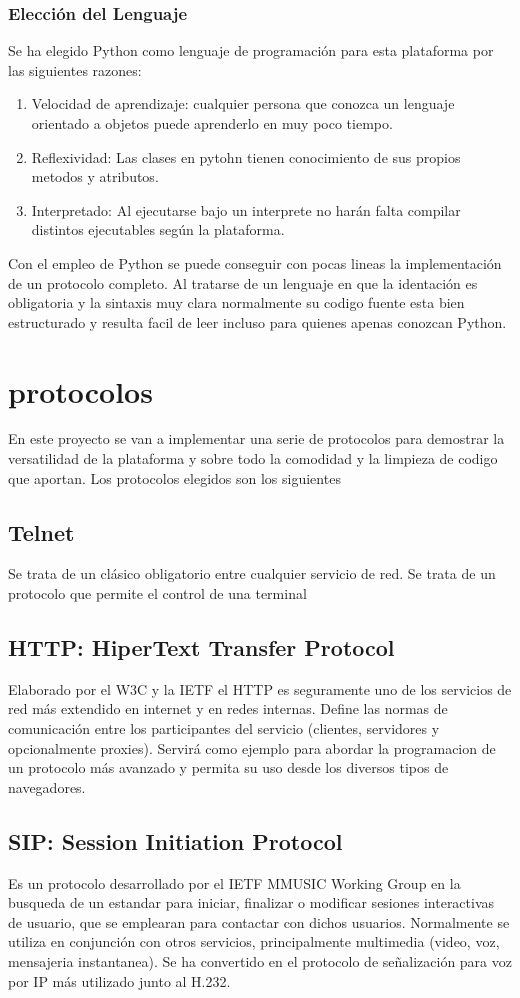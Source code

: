 \documentclass[a4paper,spanish,12pt]{book}
\begin{document}
\subsection{Elecci\'on del Lenguaje} 
Se ha elegido Python como lenguaje de programaci\'on para esta plataforma por las siguientes razones:
\begin{enumerate}
	\item Velocidad de aprendizaje: cualquier persona que conozca un lenguaje orientado a objetos puede aprenderlo en muy poco tiempo.
	\item Reflexividad: Las clases en pytohn tienen conocimiento de sus propios metodos y atributos.
	\item Interpretado: Al ejecutarse bajo un interprete no har\'an falta compilar distintos ejecutables seg\'un la plataforma.
\end{enumerate}

Con el empleo de Python se puede conseguir con pocas lineas la implementaci\'on de un protocolo completo. Al tratarse de un lenguaje en que la identaci\'on es obligatoria y la sintaxis muy clara normalmente su codigo fuente esta bien estructurado y resulta facil de leer incluso para quienes apenas conozcan Python.

\chapter{protocolos}
En este proyecto se van a implementar una serie de protocolos para demostrar la versatilidad de la plataforma y sobre todo la comodidad y la limpieza de codigo que aportan. Los protocolos elegidos son los siguientes
\section{Telnet}
Se trata de un cl\'asico obligatorio entre cualquier servicio de red. Se trata de un protocolo que permite el control de una terminal 
\section{HTTP: HiperText Transfer Protocol}
Elaborado por el W3C y la IETF el HTTP es seguramente uno de los servicios de red más extendido en internet y en redes internas. Define las normas de comunicación entre los participantes del servicio (clientes, servidores y opcionalmente proxies). Servirá como ejemplo para abordar la programacion de un protocolo m\'as avanzado y permita su uso desde los diversos tipos de navegadores.
\section{SIP: Session Initiation Protocol} 
Es un protocolo desarrollado por el IETF MMUSIC Working Group en la busqueda de un estandar para iniciar, finalizar o modificar sesiones interactivas de usuario, que se emplearan para contactar con dichos usuarios. Normalmente se utiliza en conjunción con otros servicios, principalmente multimedia (video, voz, mensajeria instantanea). Se ha convertido en el protocolo de señalización para voz por IP más utilizado junto al H.232.
\end{document}
